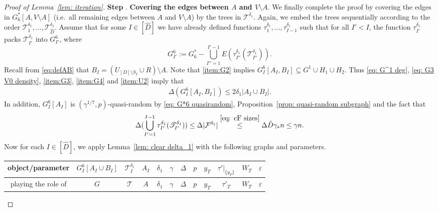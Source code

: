 \documentclass[a4paper, 11pt, reqno]{amsart}
\numberwithin{equation}{section}
\newcommand{\1}{{\rm 1\hspace*{-0.4ex}%
\rule{0.1ex}{1.52ex}\hspace*{0.2ex}}}
\newcommand{\cF}{\mathcal{F}}
\newcommand{\cT}{\mathcal{T}}
\newcommand{\I}{I}
\newcommand{\sT}{\mathscr{T}}
\renewcommand{\epsilon}{\varepsilon}
\newcommand{\sm}{\setminus}
\newcounter{step}
\newcommand{\step}[1]{\bigskip\refstepcounter{step}\textbf{Step \thestep}. \textbf{#1}.}
\begin{document}
\begin{proof}[Proof of Lemma~\ref{lem: iteration}]
\step{Covering the edges between $A$ and $V\sm A$}\label{step7}
We finally complete the proof by covering the edges in $G_6^*[A,V\sm A]$ (i.e.~all remaining edges between $A$ and $V\sm A$) by the trees in $\sT^{\delta_1}$.
Again, we embed the trees sequentially according to the order $\sT^{\delta_1}_1,\dots, \sT^{\delta_1}_{\hat{D}}$. 
Assume that for some $\I\in [\hat{D}]$ we have already defined functions $\tau^{\delta_1}_{1},\ldots,\tau^{\delta_1}_{{\I-1}}$ such that 
for all $\I'<\I$, the function
$\tau^{\delta_1}_{\I'}$ packs $\sT^{\delta_1}_{{\I}'}$ into $G^6_{{\I'}}$, where
$$G^6_{\I'}:= G^*_6 - \bigcup_{{\I}''=1}^{{\I}'-1} E(\tau^{\delta_1}_{{\I}''}(\sT^{\delta_1}_{\I''})).$$
Recall from \eqref{eq:defAB} that $B_\I=(U_{[D]\sm S_\I}\cup R)\sm A$.
Note that \ref{item:G2} implies $G_I^6[A_I, B_I] \subseteq G^1\cup H_1\cup H_2$.
Thus \eqref{eq: G^1 deg}, \eqref{eq: G3 V0 density}, \ref{item:G3}, \ref{item:G4} and \ref{item:U2} imply that 
\begin{align}\label{eq: degree between}
\Delta(G^6_{\I}[A_{\I}, B_\I])\leq 2\delta_1 |A_\I\cup B_\I|.
\end{align}
In addition,  $G^6_{\I}[A_{\I}]$ is $(\gamma^{1/7},p)$-quasi-random by \eqref{eq: G*6 quasirandom}, Proposition~\ref{prop: quasi-random subgraph} and the fact that 
$$\Delta(\bigcup_{{\I}'=1}^{{\I}-1} \tau^{\delta_1}_{{\I'}}(\sT^{\delta_1}_{\I'}))
 \leq \Delta|\cF^{\delta_1}|
  \stackrel{\eqref{eq: cF sizes}}{\leq} \Delta \hat{D}\gamma_* n
  \leq \gamma n.$$ 
Now for each ${\I}\in [\hat{D}]$, 
we apply Lemma~\ref{lem: clear delta_1} with the following graphs and parameters. \newline

\noindent
{
\begin{tabular}{c|c|c|c|c|c|c|c|c|c|c|c}
object/parameter & $G^6_{\I}[A_\I\cup B_\I]$ & $\sT^{\delta_1}_{{\I}}$ & $A_\I$ & $\delta_1$ & $\gamma$ & $\Delta$ & $p$   & $y_{T}$ & $\tau'|_{\{y_T\}}$ & $W_{T}$ & $\epsilon$ \\ \hline
playing the role of & $G$ & $\cT$ & $A$ &$\delta_1$ & $\gamma$ & $\Delta$  & $p$ & $y_{T} $ & $\tau'_{T}$ & $W_{T}$  & $\epsilon$
\end{tabular}
}\newline \vspace{0.2cm}


\end{proof}
\end{document}
